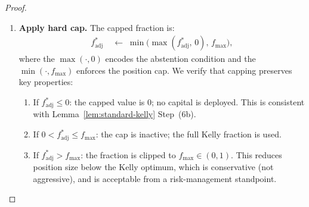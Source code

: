 \documentclass[12pt,openany]{book}
\numberwithin{equation}{chapter}
\theoremstyle{plain}
\theoremstyle{definition}
\theoremstyle{remark}
\numberwithin{equation}{chapter}
\theoremstyle{plain}
\begin{document}
\begin{proof}
\begin{enumerate}
  \item[\textup{(4)}] \textbf{Apply hard cap.}
        The capped fraction is:
        \begin{align}
          f^*_{\mathrm{adj}}
          &\;\leftarrow\;
          \min\!\bigl(\max(f^*_{\mathrm{adj}},\, 0),\,
                      f_{\max}\bigr),
          \label{eq:kelly-capped}
        \end{align}
        where the $\max(\cdot,0)$ encodes the abstention
        condition and the $\min(\cdot, f_{\max})$ enforces
        the position cap.  We verify that capping preserves
        key properties:
        \begin{enumerate}
          \item[\textup{(4a)}] If $f^*_{\mathrm{adj}} \leq 0$:
                the capped value is $0$; no capital is deployed.
                This is consistent with Lemma~\ref{lem:standard-kelly}
                Step~(6b).
          \item[\textup{(4b)}] If $0 < f^*_{\mathrm{adj}}
                \leq f_{\max}$: the cap is inactive; the
                full Kelly fraction is used.
          \item[\textup{(4c)}] If $f^*_{\mathrm{adj}} > f_{\max}$:
                the fraction is clipped to $f_{\max} \in (0,1)$.
                This reduces position size below the Kelly
                optimum, which is conservative (not aggressive),
                and is acceptable from a risk-management
                standpoint.
        \end{enumerate}


\end{enumerate}
\end{proof}
\end{document}
